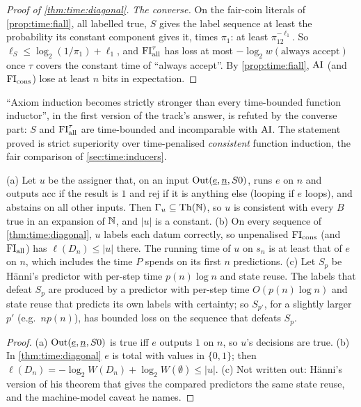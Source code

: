 \begin{proof}[Proof of \cref{thm:time:diagonal}]
\emph{The converse.} On the fair-coin literals of \cref{prop:time:fiall}, all labelled true, $S$ gives the label sequence at least the probability its constant component gives it, times $\pi_1$: at least $\pi_12^{-\ell_1}$. So $\ell_S\le\log_2(1/\pi_1)+\ell_1$, and $\mathrm{FI}_{\mathrm{all}}^\tau$ has loss at most $-\log_2w(\text{always accept})$ once $\tau$ covers the constant time of ``always accept''. By \cref{prop:time:fiall}, $\mathrm{AI}$ (and $\mathrm{FI}_{\mathrm{cons}}$) lose at least $n$ bits in expectation.
\end{proof}

\noindent ``Axiom induction becomes strictly stronger than every time-bounded function inductor'', in the first version of the track's answer, is refuted by the converse part: $S$ and $\mathrm{FI}_{\mathrm{all}}^\tau$ are time-bounded and incomparable with $\mathrm{AI}$. The statement proved is strict superiority over time-penalised \emph{consistent} function induction, the fair comparison of \cref{sec:time:inducers}.

\begin{proposition}\label{prop:time:evaluator}
(a) Let $u$ be the assigner that, on an input $\mathrm{Out}(\underline{e},\underline{n},S0)$, runs $e$ on $n$ and outputs acc if the result is $1$ and rej if it is anything else (looping if $e$ loops), and abstains on all other inputs. Then $\Gamma_u\subseteq\mathrm{Th}(\mathbb{N})$, so $u$ is consistent with every $B$ true in an expansion of $\mathbb{N}$, and $|u|$ is a constant.
(b) On every sequence of \cref{thm:time:diagonal}, $u$ labels each datum correctly, so unpenalised $\mathrm{FI}_{\mathrm{cons}}$ (and $\mathrm{FI}_{\mathrm{all}}$) has $\ell(D_n)\le|u|$ there. The running time of $u$ on $s_n$ is at least that of $e$ on $n$, which includes the time $P$ spends on its first $n$ predictions.
(c) Let $S_p$ be H\"anni's predictor with per-step time $p(n)\log n$ and state reuse. The labels that defeat $S_p$ are produced by a predictor with per-step time $O(p(n)\log n)$ and state reuse that predicts its own labels with certainty; so $S_{p'}$, for a slightly larger $p'$ (e.g.\ $np(n)$), has bounded loss on the sequence that defeats $S_p$.
\end{proposition}

\begin{proof}
(a) $\mathrm{Out}(\underline{e},\underline{n},S0)$ is true iff $e$ outputs $1$ on $n$, so $u$'s decisions are true. (b) In \cref{thm:time:diagonal} $e$ is total with values in $\{0,1\}$; then $\ell(D_n)=-\log_2W(D_n)+\log_2W(\emptyset)\le|u|$. (c) Not written out: H\"anni's version of his theorem that gives the compared predictors the same state reuse, and the machine-model caveat he names.
\end{proof}

